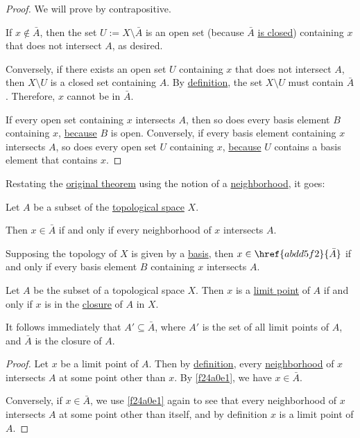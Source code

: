 \begin{proof}
   We will prove by contrapositive.

  If $x\notin\bar A$, then the set $U:=X\setminus\bar A$ is an open set
  (because $\bar A$ \href{abdd5f2}{is closed}) containing $x$ that does not
  intersect $A$, as desired.

  Conversely, if there exists an open set $U$ containing $x$ that does not
  intersect $A$, then $X\setminus U$ is a closed set containing $A$. By
  \href{abdd5f2}{definition}, the set $X\setminus U$ must contain $\bar A$.
  Therefore, $x$ cannot be in $\bar A$.

   If every open set containing $x$ intersects $A$, then so does
  every basis element $B$ containing $x$, \href{e6b5306}{because} $B$ is open.
  Conversely, if every basis element containing $x$ intersects $A$, so does
  every open set $U$ containing $x$, \href{e6b5306}{because} $U$ contains a
  basis element that contains $x$.
\end{proof}

\label{f24a0e1}

Restating the \href{c68b271}{original theorem} using the notion of a
\href{de512d5}{neighborhood}, it goes:

Let $A$ be a subset of the \href{de3c1b1}{topological space} $X$.
\begin{enumerata}
  \item Then $x\in\bar A$ if and only if every neighborhood of $x$ intersects
        $A$.
  \item Supposing the topology of $X$ is given by a \href{e896402}{basis}, then
        $x\in\href{abdd5f2}{\bar A}$ if and only if every basis element $B$
        containing $x$ intersects $A$.
\end{enumerata}

\label{f79da12}

Let $A$ be the subset of a topological space $X$. Then $x$ is a
\href{b0219cd}{limit point} of $A$ if and only if $x$ is in the
\href{abdd5f2}{closure} of $A$ in $X$.

It follows immediately that $A'\subseteq\bar A$, where $A'$ is the set of all
limit points of $A$, and $\bar A$ is the closure of $A$.

\begin{proof}
  Let $x$ be a limit point of $A$. Then by \href{b0219cd}{definition}, every
  \href{de512d5}{neighborhood} of $x$ intersects $A$ at some point other than
  $x$. By \autoref{f24a0e1}, we have $x\in\bar A$.

  Conversely, if $x\in\bar A$, we use \autoref{f24a0e1} again to see that every
  neighborhood of $x$ intersects $A$ at some point other than itself, and by
  definition $x$ is a limit point of $A$.
\end{proof}

